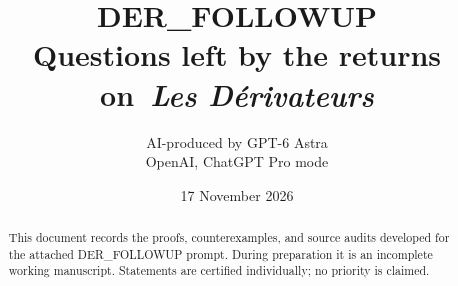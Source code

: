 \documentclass[11pt,a4paper]{article}
\title{DER\_FOLLOWUP\\Questions left by the returns on\ \emph{Les D\'erivateurs}}
\author{AI-produced by GPT-6 Astra\\OpenAI, ChatGPT Pro mode}
\date{17 November 2026}
\theoremstyle{definition}
\begin{document}
\maketitle
\begin{abstract}
This document records the proofs, counterexamples, and source audits developed
for the attached DER\_FOLLOWUP prompt. During preparation it is an incomplete
working manuscript. Statements are certified individually; no priority is claimed.
\end{abstract}
\tableofcontents
\clearpage



\end{document}
